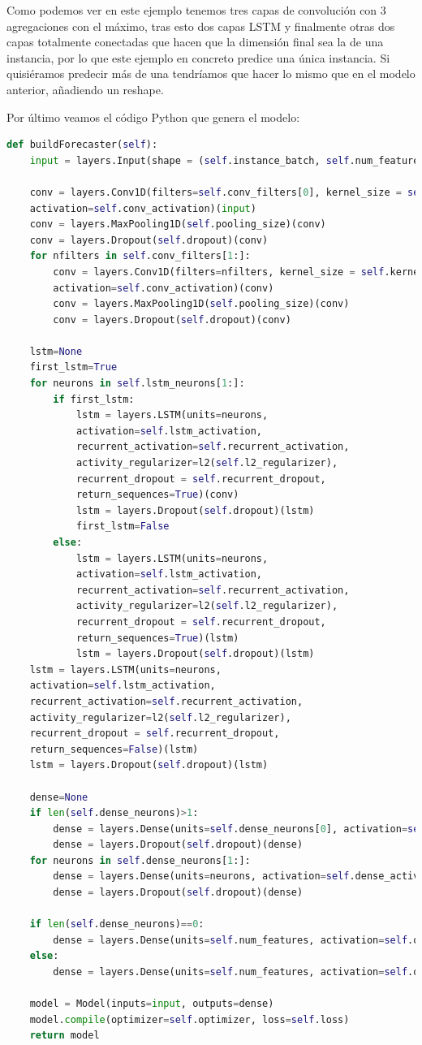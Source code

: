 Como podemos ver en este ejemplo tenemos tres capas de convolución con 3 agregaciones con el máximo, tras esto dos capas LSTM y finalmente otras dos capas totalmente conectadas que hacen que la dimensión final sea la de una instancia, por lo que este ejemplo en concreto predice una única instancia. Si quisiéramos predecir más de una tendríamos que hacer lo mismo que en el modelo anterior, añadiendo un reshape.

Por último veamos el código Python que genera el modelo:

\begin{lstlisting}[language=Python]
def buildForecaster(self):
	input = layers.Input(shape = (self.instance_batch, self.num_features))
	
	conv = layers.Conv1D(filters=self.conv_filters[0], kernel_size = self.kernel_size,
	activation=self.conv_activation)(input)
	conv = layers.MaxPooling1D(self.pooling_size)(conv)
	conv = layers.Dropout(self.dropout)(conv)
	for nfilters in self.conv_filters[1:]:
		conv = layers.Conv1D(filters=nfilters, kernel_size = self.kernel_size,
		activation=self.conv_activation)(conv)
		conv = layers.MaxPooling1D(self.pooling_size)(conv)
		conv = layers.Dropout(self.dropout)(conv)
	
	lstm=None
	first_lstm=True
	for neurons in self.lstm_neurons[1:]:
		if first_lstm:
			lstm = layers.LSTM(units=neurons,
			activation=self.lstm_activation,
			recurrent_activation=self.recurrent_activation,
			activity_regularizer=l2(self.l2_regularizer),
			recurrent_dropout = self.recurrent_dropout,
			return_sequences=True)(conv)
			lstm = layers.Dropout(self.dropout)(lstm)
			first_lstm=False
		else:
			lstm = layers.LSTM(units=neurons,
			activation=self.lstm_activation,
			recurrent_activation=self.recurrent_activation,
			activity_regularizer=l2(self.l2_regularizer),
			recurrent_dropout = self.recurrent_dropout,
			return_sequences=True)(lstm)
			lstm = layers.Dropout(self.dropout)(lstm)
	lstm = layers.LSTM(units=neurons,
	activation=self.lstm_activation,
	recurrent_activation=self.recurrent_activation,
	activity_regularizer=l2(self.l2_regularizer),
	recurrent_dropout = self.recurrent_dropout,
	return_sequences=False)(lstm)
	lstm = layers.Dropout(self.dropout)(lstm)
	
	dense=None
	if len(self.dense_neurons)>1:
		dense = layers.Dense(units=self.dense_neurons[0], activation=self.dense_activation)(lstm)
		dense = layers.Dropout(self.dropout)(dense)
	for neurons in self.dense_neurons[1:]:
		dense = layers.Dense(units=neurons, activation=self.dense_activation)(dense)
		dense = layers.Dropout(self.dropout)(dense)
	
	if len(self.dense_neurons)==0:
		dense = layers.Dense(units=self.num_features, activation=self.output_activation)(lstm)
	else:
		dense = layers.Dense(units=self.num_features, activation=self.output_activation)(dense)
	
	model = Model(inputs=input, outputs=dense)
	model.compile(optimizer=self.optimizer, loss=self.loss)
	return model
\end{lstlisting}